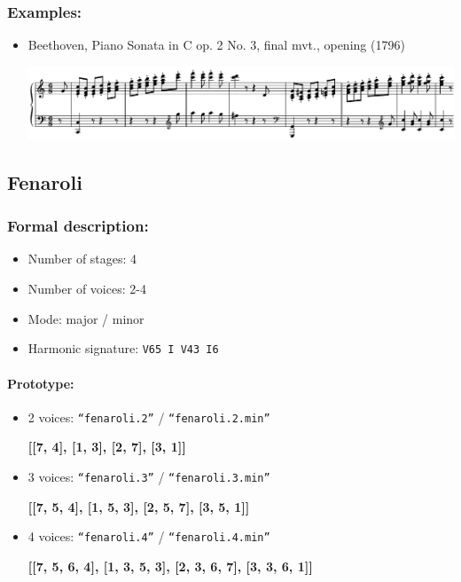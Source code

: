 ﻿\documentclass[11pt, openany]{article}
\begin{document}
\subsubsection{Examples:}
\begin{itemize}
\item Beethoven, Piano Sonata in C op. 2 No. 3, final mvt., opening (1796)
\begin{center}
\includegraphics[scale=0.6]{beethoven2.png}
\end{center}
\end{itemize}


	\subsection{Fenaroli}
	
\subsubsection{Formal description:}
\begin{itemize}
\item Number of stages: 4
\item Number of voices: 2-4
\item Mode: major / minor
\item Harmonic signature: \texttt{V65 I V43 I6}
\end{itemize}

\paragraph{Prototype:}
\begin{itemize}
\item 2 voices: \texttt{“fenaroli.2”} / \texttt{“fenaroli.2.min”}
	\begin{center}
	\textbf{[[7, 4], [1, 3], [2, 7], [3, 1]]}
	\end{center}
\item 3 voices: \texttt{“fenaroli.3”} / \texttt{“fenaroli.3.min”}
	\begin{center}
	\textbf{[[7, 5, 4], [1, 5, 3], [2, 5, 7], [3, 5, 1]]}
	\end{center}
\item 4 voices: \texttt{“fenaroli.4”} / \texttt{“fenaroli.4.min”}
	\begin{center}
	\textbf{[[7, 5, 6, 4], [1, 3, 5, 3], [2, 3, 6, 7], [3, 3, 6, 1]]}
	\end{center}
\end{itemize}
\end{document}
